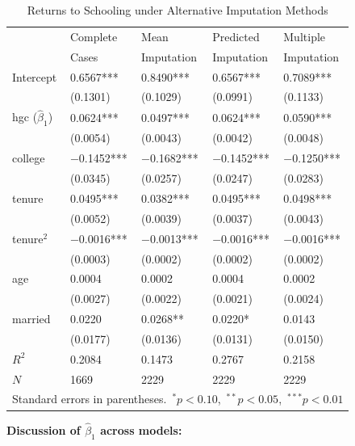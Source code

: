 \documentclass[12pt]{article}
\begin{document}
\begin{table}[ht]
\centering
\caption{Returns to Schooling under Alternative Imputation Methods}
\label{tab:regression}
\begin{tabular}{lllll}
\hline
               & Complete   & Mean       & Predicted  & Multiple    \\
               & Cases      & Imputation & Imputation & Imputation  \\
\hline
Intercept      & 0.6567***  & 0.8490***  & 0.6567***  & 0.7089***   \\
               & (0.1301)   & (0.1029)   & (0.0991)   & (0.1133)    \\
hgc ($\hat{\beta}_1$) & 0.0624*** & 0.0497*** & 0.0624*** & 0.0590*** \\
               & (0.0054)   & (0.0043)   & (0.0042)   & (0.0048)    \\
college        & $-$0.1452*** & $-$0.1682*** & $-$0.1452*** & $-$0.1250*** \\
               & (0.0345)   & (0.0257)   & (0.0247)   & (0.0283)    \\
tenure         & 0.0495***  & 0.0382***  & 0.0495***  & 0.0498***   \\
               & (0.0052)   & (0.0039)   & (0.0037)   & (0.0043)    \\
tenure$^2$     & $-$0.0016*** & $-$0.0013*** & $-$0.0016*** & $-$0.0016*** \\
               & (0.0003)   & (0.0002)   & (0.0002)   & (0.0002)    \\
age            & 0.0004     & 0.0002     & 0.0004     & 0.0002      \\
               & (0.0027)   & (0.0022)   & (0.0021)   & (0.0024)    \\
married        & 0.0220     & 0.0268**   & 0.0220*    & 0.0143      \\
               & (0.0177)   & (0.0136)   & (0.0131)   & (0.0150)    \\
$R^2$          & 0.2084     & 0.1473     & 0.2767     & 0.2158      \\
$N$            & 1669       & 2229       & 2229       & 2229        \\
\hline
\multicolumn{5}{l}{\small Standard errors in parentheses.\
  $^*p<0.10$,\ $^{**}p<0.05$,\ $^{***}p<0.01$}
\end{tabular}
\end{table}

\noindent\textbf{Discussion of $\hat{\beta}_1$ across models:}
\end{document}
